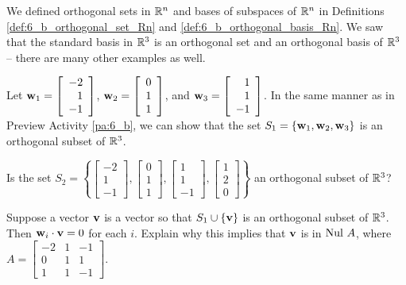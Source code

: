 
We defined orthogonal sets in $\mathbb{R}^n$ and bases of subspaces of $\mathbb{R}^n$ in Definitions \ref{def:6_b_orthogonal_set_Rn} and \ref{def:6_b_orthogonal_basis_Rn}. We saw that the standard basis in $\mathbb{R}^3$ is an orthogonal set and an orthogonal basis of $\mathbb{R}^3$ -- there are many other examples as well.



\begin{activity} \label{act:6_b_orthog} Let $\mathbf{w}_1 = \left[ \begin{array}{r} -2 \\ 1 \\ -1 \end{array} \right]$, $\mathbf{w}_2 = \left[ \begin{array}{r} 0 \\ 1 \\ 1 \end{array} \right]$, and $\mathbf{w}_3 = \left[ \begin{array}{r} 1 \\ 1 \\ -1 \end{array} \right]$. In the same manner as in Preview Activity \ref{pa:6_b}, we can show that the set $S_1 = \left\{ \mathbf{w}_1, \mathbf{w}_2, \mathbf{w}_3  \right\}$ is an orthogonal subset of $\mathbb{R}^3$. 
	\ba
	\item Is the set $S_2 = \left\{ \left[ \begin{array}{r} -2 \\ 1 \\ -1 \end{array} \right], \left[ \begin{array}{r} 0 \\ 1 \\ 1 \end{array} \right], \left[ \begin{array}{r} 1 \\ 1 \\ -1 \end{array} \right], \left[ \begin{array}{r} 1 \\ 2 \\ 0 \end{array} \right] \right\}$ an orthogonal subset of $\mathbb{R}^3$?
	
	

	\item Suppose a vector $\mathbf{v}$ is a vector so that $S_1 \cup \{\mathbf{v}\}$ is an orthogonal subset of $\mathbb{R}^3$. Then $\mathbf{w}_i \cdot \mathbf{v} = 0$ for each $i$. Explain why this implies that $\mathbf{v}$ is in $\text{Nul } A$, where $A =  \left[ \begin{array}{rcr} -2&1&-1 \\ 0&1&1 \\ 1&1&-1 \end{array} \right]$. 
	

\end{activity}
